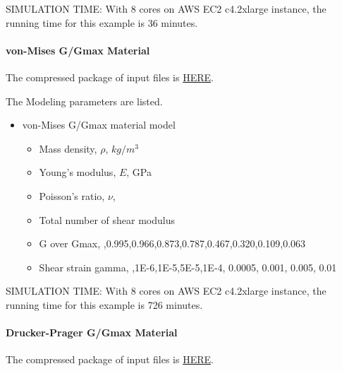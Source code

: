 SIMULATION TIME: With 8 cores on AWS EC2 c4.2xlarge instance, the running time for this example is 36 minutes.


\paragraph{von-Mises G/Gmax Material}
The compressed package of input files is  
\href{https://github.com/yuan-energy/Real-ESSI-Short-Course-Examples/tree/master/short-course-examples/nonlinear_analysis_steps/soil-foundation/vonMisesGoverGmax/vonMisesGoverGmax.tgz?raw=true}{HERE}. 

The Modeling parameters are listed.
\begin{itemize}
  \item von-Mises G/Gmax material model 
  \begin{itemize}
    \item Mass density, $\rho$, \enspace {} $kg/m^3$
    \item Young's modulus, $E$, \enspace {} GPa
    \item Poisson's ratio, $\nu$, \enspace {}
    \item Total number of shear modulus \enspace {}
    \item G over Gmax, \enspace {},0.995,0.966,0.873,0.787,0.467,0.320,0.109,0.063
    \item Shear strain gamma, \enspace {},1E-6,1E-5,5E-5,1E-4, 0.0005, 0.001, 0.005, 0.01
  \end{itemize}
\end{itemize}

SIMULATION TIME: With 8 cores on AWS EC2 c4.2xlarge instance, the running time for this example is 726 minutes.


\paragraph{Drucker-Prager G/Gmax Material}
The compressed package of input files is  
\href{https://github.com/yuan-energy/Real-ESSI-Short-Course-Examples/tree/master/short-course-examples/nonlinear_analysis_steps/soil-foundation/DruckerPragerGoverGmax/DruckerPragerGoverGmax.tgz?raw=true}{HERE}. 


